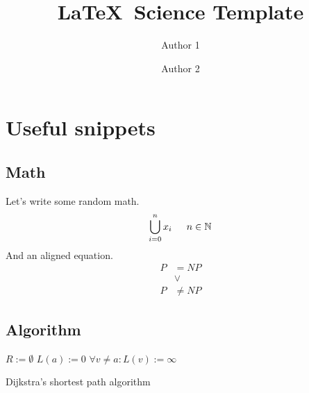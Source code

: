 \documentclass[a4paper]{article}
\begin{document}
	\title{\LaTeX\ Science Template}
	\author{Author 1 \and Author 2}
	\maketitle
	
	\pagebreak
	
	\tableofcontents
	\pagebreak
	
	\section{Useful snippets}
	
	\subsection{Math}
	Let's write some random math.
	\[ \bigcup_{i=0}^{n} x_i \indent n \in \mathbb{N} \]
	And an aligned equation.
	\begin{equation}
		\begin{split}
			P &= NP\\
			&\vee \\
			P&\neq NP
		\end{split}
	\end{equation}
	
	\subsection{Algorithm}
	\begin{algorithm}[H]
		$R:=\emptyset$\;
		$L(a):=0$\;
		$\forall v\neq a:L(v):=\infty$\;
		\caption{Dijkstra's shortest path algorithm}
	\end{algorithm}	
\end{document}
